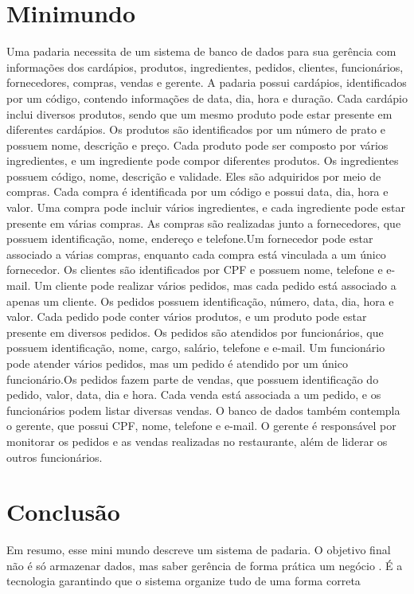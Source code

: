 \documentclass{article}
\begin{document}
\section{Minimundo}
Uma padaria necessita de um sistema de banco de dados para sua gerência com informações dos cardápios, produtos, ingredientes, pedidos, clientes, funcionários, fornecedores, compras, vendas e gerente. A padaria possui cardápios, identificados por um código, contendo informações de data, dia, hora e duração. Cada cardápio inclui diversos produtos, sendo que um mesmo produto pode estar presente em diferentes cardápios. Os produtos são identificados por um número de prato e possuem nome, descrição e preço. Cada produto pode ser composto por vários ingredientes, e um ingrediente pode compor diferentes produtos. Os ingredientes possuem código, nome, descrição e validade. Eles são adquiridos por meio de compras. Cada compra é identificada por um código e possui data, dia, hora e valor. Uma compra pode incluir vários ingredientes, e cada ingrediente pode estar presente em várias compras. As compras são realizadas junto a fornecedores, que possuem identificação, nome, endereço e telefone.Um fornecedor pode estar associado a várias compras, enquanto cada compra está vinculada a um único fornecedor. Os clientes são identificados por CPF e possuem nome, telefone e e-mail. Um cliente pode realizar vários pedidos, mas cada pedido está associado a apenas um cliente. Os pedidos possuem identificação, número, data, dia, hora e valor. Cada pedido pode conter vários produtos, e um produto pode estar presente em diversos pedidos. Os pedidos são atendidos por funcionários, que possuem identificação, nome, cargo, salário, telefone e e-mail. Um funcionário pode atender vários pedidos, mas um pedido é atendido por um único funcionário.Os pedidos fazem parte de vendas, que possuem identificação do pedido, valor, data, dia e hora. Cada venda está associada a um pedido, e os funcionários podem listar diversas vendas. O banco de dados também contempla o gerente, que possui CPF, nome, telefone e e-mail. O gerente é responsável por monitorar os pedidos e as vendas realizadas no restaurante, além de liderar os outros funcionários.

\section{Conclusão}
Em resumo, esse mini mundo descreve um sistema de padaria.
O objetivo final não é só armazenar dados, mas saber gerência de forma prática um negócio . É a tecnologia garantindo que o sistema organize tudo de uma forma correta\newpage
\end{document}
